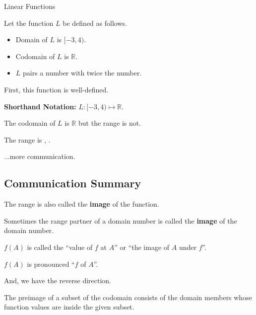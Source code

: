 \documentclass{ximera}
\begin{document}
\begin{example} Linear Functions

Let the function $L$ be defined as follows.


\begin{itemize}
\item Domain of $L$ is $[-3, 4)$.
\item Codomain of $L$ is $\mathbb{R}$.
\item $L$ pairs a number with twice the number.
\end{itemize}


First, this function is well-defined. 


\textbf{Shorthand Notation: } $L: [-3, 4) \mapsto \mathbb{R}$.



\begin{question}  

The codomain of $L$ is $\mathbb{R}$ but the range is not.  

The range is \wordChoice{\choice[correct]{[}\choice{(}}  ,  \wordChoice{\choice{]}\choice[correct]{)}}.

\end{question}



\end{example}
...more communication. 






\subsection*{Communication Summary}







The range is also called the \textbf{image} of the function.   

Sometimes the range partner of a domain number is called the \textbf{image} of the domain number.

$f(A)$ is called the ``value of $f$ at $A$'' or ``the image of $A$ under $f$''.


$f(A)$ is pronounced ``$f$ of $A$''.


And, we have the reverse direction.

The preimage of a subset of the codomain consists of the domain members whose function values are inside the given subset.
\end{document}
